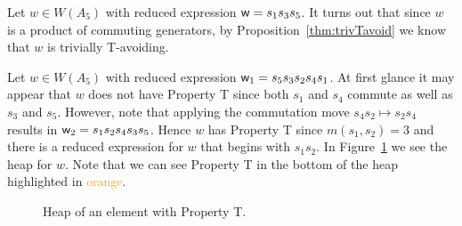 \begin{example}\label{ex:tavoid}
Let $w \in W(A_5)$ with reduced expression $\mathsf{w}=s_1s_3s_5$. It turns out that since $w$ is a product of commuting generators, by Proposition~\ref{thm:trivTavoid} we know that $w$ is trivially T-avoiding. %
\end{example}
\begin{example}\label{ex:prop-T}
Let $w \in W(A_5)$ with reduced expression $\mathsf{w}_1=s_5s_3s_2s_4s_1$. At first glance it may appear that $w$ does not have Property T since both $s_1$ and $s_4$ commute as well as $s_3$ and $s_5$. However, note that applying the commutation move $s_4s_2 \mapsto s_2s_4$ results in $\mathsf{w}_2=s_1s_2s_4s_3s_5$. Hence $w$ has Property T since $m(s_1,s_2)=3$ and there is a reduced expression for $w$ that begins with $s_1s_2$. In Figure~\ref{fig:heapw/T} we see the heap for $w$. Note that we can see Property T in the bottom of the heap highlighted in \textcolor{orange}{orange}.
\end{example}

\begin{figure}[h!]\centering
{}
\caption{Heap of an element with Property T.} \label{fig:heapw/T}	
\end{figure}

